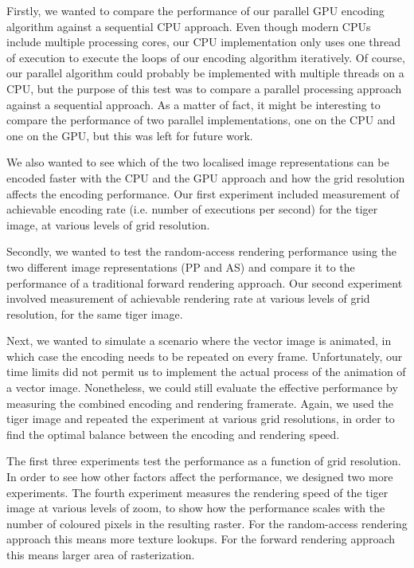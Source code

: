 \documentclass[11pt,a4paper,twoside]{article}
\begin{document}
Firstly, we wanted to compare the performance of our parallel GPU encoding algorithm against a sequential CPU approach. Even though modern CPUs include multiple processing cores, our CPU implementation only uses one thread of execution to execute the loops of our encoding algorithm iteratively. Of course, our parallel algorithm could probably be implemented with multiple threads on a CPU, but the purpose of this test was to compare a parallel processing approach against a sequential approach. As a matter of fact, it might be interesting to compare the performance of two parallel implementations, one on the CPU and one on the GPU, but this was left for future work.

We also wanted to see which of the two localised image representations can be encoded faster with the CPU and the GPU approach and how the grid resolution affects the encoding performance. Our first experiment included measurement of achievable encoding rate (i.e. number of executions per second) for the tiger image, at various levels of grid resolution.

Secondly, we wanted to test the random-access rendering performance using the two different image representations (PP and AS) and compare it to the performance of a traditional forward rendering approach. Our second experiment involved measurement of achievable rendering rate at various levels of grid resolution, for the same tiger image.

Next, we wanted to simulate a scenario where the vector image is animated, in which case the encoding needs to be repeated on every frame. Unfortunately, our time limits did not permit us to implement the actual process of the animation of a vector image. Nonetheless, we could still evaluate the effective performance by measuring the combined encoding and rendering framerate. Again, we used the tiger image and repeated the experiment at various grid resolutions, in order to find the optimal balance between the encoding and rendering speed.

The first three experiments test the performance as a function of grid resolution. In order to see how other factors affect the performance, we designed two more experiments. The fourth experiment measures the rendering speed of the tiger image at various levels of zoom, to show how the performance scales with the number of coloured pixels in the resulting raster. For the random-access rendering approach this means more texture lookups. For the forward rendering approach this means larger area of rasterization.
\end{document}
